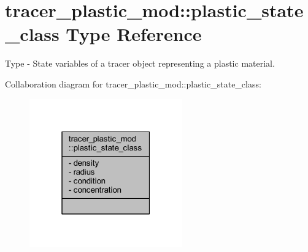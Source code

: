 \hypertarget{structtracer__plastic__mod_1_1plastic__state__class}{}\section{tracer\+\_\+plastic\+\_\+mod\+:\+:plastic\+\_\+state\+\_\+class Type Reference}
\label{structtracer__plastic__mod_1_1plastic__state__class}


Type -\/ State variables of a tracer object representing a plastic material.  




Collaboration diagram for tracer\+\_\+plastic\+\_\+mod\+:\+:plastic\+\_\+state\+\_\+class\+:
\nopagebreak
\begin{figure}[H]
\begin{center}
\leavevmode
\includegraphics[width=187pt]{structtracer__plastic__mod_1_1plastic__state__class__coll__graph}
\end{center}
\end{figure}
